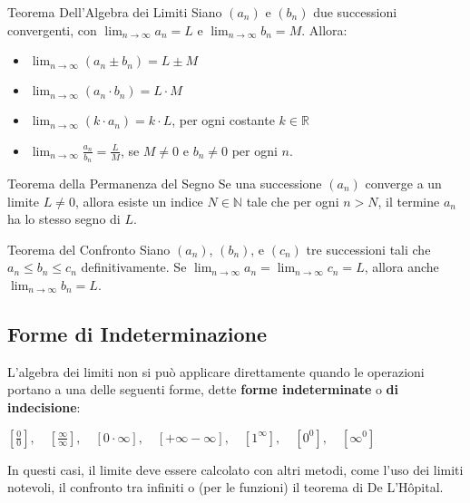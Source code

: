 \begin{theorem}{Teorema Dell'Algebra dei Limiti}{}
    Siano $(a_n)$ e $(b_n)$ due successioni convergenti, con $\lim_{n \to \infty} a_n = L$ e $\lim_{n \to \infty} b_n = M$. Allora:
    \begin{itemize}
        \item $\lim_{n \to \infty} (a_n \pm b_n) = L \pm M$
        \item $\lim_{n \to \infty} (a_n \cdot b_n) = L \cdot M$
        \item $\lim_{n \to \infty} (k \cdot a_n) = k \cdot L$, per ogni costante $k \in \mathbb{R}$
        \item $\lim_{n \to \infty} \frac{a_n}{b_n} = \frac{L}{M}$, se $M \neq 0$ e $b_n \neq 0$ per ogni $n$.
    \end{itemize}
\end{theorem}

\begin{theorem}{Teorema della Permanenza del Segno}{}
    Se una successione $(a_n)$ converge a un limite $L \neq 0$, allora esiste un indice $N \in \mathbb{N}$ tale che per ogni $n > N$, il termine $a_n$ ha lo stesso segno di $L$.
\end{theorem}

\begin{theorem}{Teorema del Confronto}{}
    Siano $(a_n)$, $(b_n)$, e $(c_n)$ tre successioni tali che $a_n \le b_n \le c_n$ definitivamente. Se $\lim_{n \to \infty} a_n = \lim_{n \to \infty} c_n = L$, allora anche $\lim_{n \to \infty} b_n = L$.
\end{theorem}

\subsection{Forme di Indeterminazione}
L'algebra dei limiti non si può applicare direttamente quando le operazioni portano a una delle seguenti forme, dette \textbf{forme indeterminate} o \textbf{di indecisione}:
\begin{center}
    $ \left[ \frac{0}{0} \right], \quad \left[ \frac{\infty}{\infty} \right], \quad [0 \cdot \infty], \quad [+\infty - \infty], \quad [1^\infty], \quad [0^0], \quad [\infty^0] $
\end{center}
In questi casi, il limite deve essere calcolato con altri metodi, come l'uso dei limiti notevoli, il confronto tra infiniti o (per le funzioni) il teorema di De L'Hôpital.

